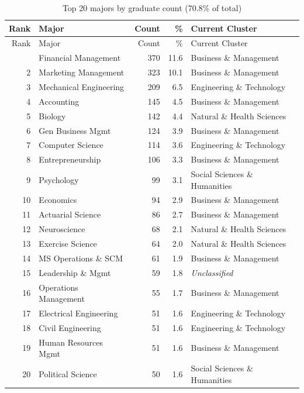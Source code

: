 \documentclass[
  11pt,
  letterpaper,
]{report}
\begin{document}
\begin{longtable}[]{@{}rlrrl@{}}
\caption{Top 20 majors by graduate count (70.8\% of
total)}\label{tbl-top20}\tabularnewline
\toprule\noalign{}
Rank & Major & Count & \% & Current Cluster \\
\midrule\noalign{}
\endfirsthead
\toprule\noalign{}
Rank & Major & Count & \% & Current Cluster \\
\midrule\noalign{}
\endhead
\bottomrule\noalign{}
\endlastfoot
1 & Financial Management & 370 & 11.6 & Business \& Management \\
2 & Marketing Management & 323 & 10.1 & Business \& Management \\
3 & Mechanical Engineering & 209 & 6.5 & Engineering \& Technology \\
4 & Accounting & 145 & 4.5 & Business \& Management \\
5 & Biology & 142 & 4.4 & Natural \& Health Sciences \\
6 & Gen Business Mgmt & 124 & 3.9 & Business \& Management \\
7 & Computer Science & 114 & 3.6 & Engineering \& Technology \\
8 & Entrepreneurship & 106 & 3.3 & Business \& Management \\
9 & Psychology & 99 & 3.1 & Social Sciences \& Humanities \\
10 & Economics & 94 & 2.9 & Business \& Management \\
11 & Actuarial Science & 86 & 2.7 & Business \& Management \\
12 & Neuroscience & 68 & 2.1 & Natural \& Health Sciences \\
13 & Exercise Science & 64 & 2.0 & Natural \& Health Sciences \\
14 & MS Operations \& SCM & 61 & 1.9 & Business \& Management \\
15 & Leadership \& Mgmt & 59 & 1.8 & \emph{Unclassified} \\
16 & Operations Management & 55 & 1.7 & Business \& Management \\
17 & Electrical Engineering & 51 & 1.6 & Engineering \& Technology \\
18 & Civil Engineering & 51 & 1.6 & Engineering \& Technology \\
19 & Human Resources Mgmt & 51 & 1.6 & Business \& Management \\
20 & Political Science & 50 & 1.6 & Social Sciences \& Humanities \\
\end{longtable}
\end{document}
